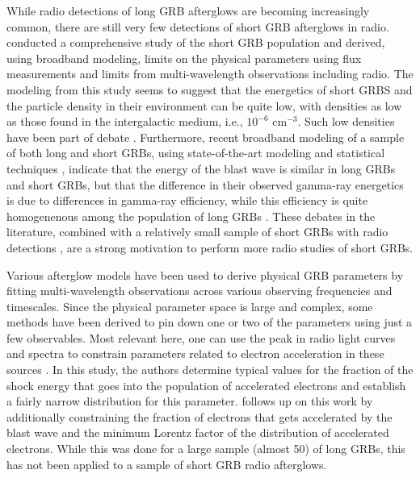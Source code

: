 \documentclass[12pt]{article}
\begin{document}
While radio detections of long GRB afterglows are becoming increasingly common, there are still very few detections of short GRB afterglows in radio. \citet{2015ApJ...815..102F} conducted a comprehensive study of the short GRB population and derived, using broadband modeling, limits on the physical parameters using flux measurements and limits from multi-wavelength observations including radio. The modeling from this study seems to suggest that the energetics of short GRBS and the particle density in their environment can be quite low, with densities as low as those found in the intergalactic medium, i.e., $10^{-6}$ cm$^{-3}$. Such low densities have been part of debate \citep{2020MNRAS.495.4782O}. Furthermore, recent broadband modeling of a sample of both long and short GRBs, using state-of-the-art modeling and statistical techniques \citep{2022MNRAS.511.2848A}, indicate that the energy of the blast wave is similar in long GRBs and short GRBs, but that the difference in their observed gamma-ray energetics is due to differences in gamma-ray efficiency, while this efficiency is quite homogenenous among the population of long GRBs \citep{2016MNRAS.461...51B}. These debates in the literature, combined with a relatively small sample of short GRBs with radio detections \citep{2021ApJ...906..127F}, are a strong motivation to perform more radio studies of short GRBs.

Various afterglow models \citep[e.g.,][]{2002ApJ...568..820G,2012ApJ...749...44V} have been used to derive physical GRB parameters by fitting multi-wavelength observations across various observing frequencies and timescales. Since the physical parameter space is large and complex, some methods have been derived to pin down one or two of the parameters using just a few observables. Most relevant here, one can use the peak in radio light curves and spectra to constrain parameters related to electron acceleration in these sources \citep{2017MNRAS.472.3161B}. In this study, the authors determine typical values for the fraction of the shock energy that goes into the population of accelerated electrons and establish a fairly narrow distribution for this parameter. \citet{2023MNRAS.518.1522D} follows up on this work by additionally constraining the fraction of electrons that gets accelerated by the blast wave and the minimum Lorentz factor of the distribution of accelerated electrons. While this was done for a large sample (almost 50) of long GRBs, this has not been applied to a sample of short GRB radio afterglows.
\end{document}
